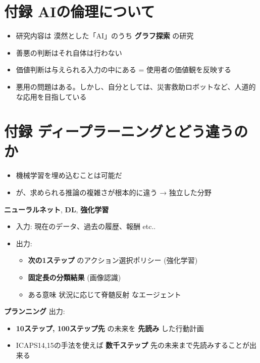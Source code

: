 \section{付録 AIの倫理について}
\label{sec-14}

\begin{itemize}
\item 研究内容は 漠然とした「AI」のうち \textbf{グラフ探索} の研究
\item 善悪の判断はそれ自体は行わない
\item 価値判断は与えられる入力の中にある = 使用者の価値観を反映する
\item 悪用の問題はある。しかし、自分としては、災害救助ロボットなど、人道的な応用を目指している
\end{itemize}

\section{付録 ディープラーニングとどう違うのか}
\label{sec-15}

\begin{itemize}
\item 機械学習を埋め込むことは可能だ
\item が、求められる推論の複雑さが根本的に違う → 独立した分野
\end{itemize}

\begin{container-fluid}
\begin{row-fluid}
\begin{span7}
\textbf{ニューラルネット}, \textbf{DL}, \textbf{強化学習}
\begin{itemize}
\item 入力: 現在のデータ、過去の履歴、報酬 etc..
\item 出力:
\begin{itemize}
\item \textbf{次の1ステップ} のアクション選択ポリシー (強化学習)
\item \textbf{固定長の分類結果} (画像認識)
\item ある意味 状況に応じて脊髄反射 なエージェント
\end{itemize}
\end{itemize}
\end{span7}
\begin{span5}
\textbf{プランニング}
出力:
\begin{itemize}
\item \textbf{10ステップ, 100ステップ先} の未来を \textbf{先読み} した行動計画
\item ICAPS14,15の手法を使えば \textbf{数千ステップ} 先の未来まで先読みすることが出来る
\end{itemize}
\end{span5}
\end{row-fluid}
\end{container-fluid}

